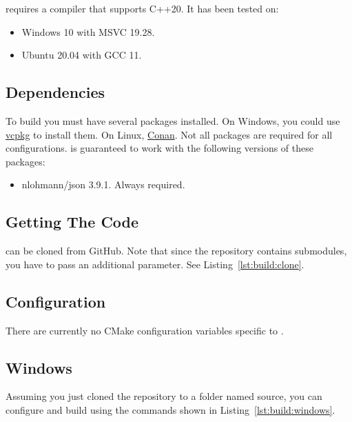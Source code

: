  requires a compiler that supports C++20. It has been tested on:

\begin{itemize}
	\item Windows 10 with MSVC 19.28.
	\item Ubuntu 20.04 with GCC 11.
\end{itemize}

\subsection{Dependencies}

To build  you must have several packages installed. On Windows, you could use \href{https://github.com/microsoft/vcpkg}{vcpkg} to install them. On Linux, \href{https://conan.io}{Conan}. Not all packages are required for all configurations.  is guaranteed to work with the following versions of these packages:

\begin{itemize}
	\item nlohmann/json 3.9.1\cite{nlohmann}. Always required.
\end{itemize}

\subsection{Getting The Code}
\label{section:build:get}

 can be cloned from GitHub. Note that since the repository contains submodules, you have to pass an additional parameter. See Listing~\ref{lst:build:clone}.



\subsection{Configuration}
\label{section:build:config}

There are currently no CMake configuration variables specific to .

\subsection{Windows}
\label{section:build:windows}

Assuming you just cloned the repository to a folder named source, you can configure and build using the commands shown in Listing~\ref{lst:build:windows}.

